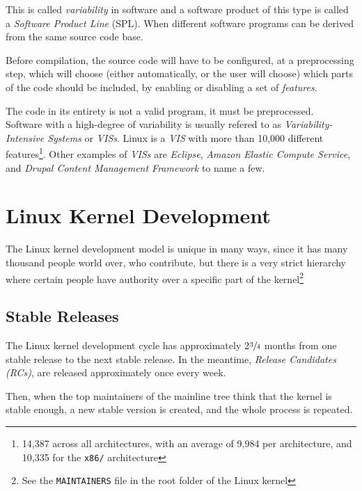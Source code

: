 \documentclass[a4paper,11pt]{report}
\newcommand{\textcode}[1]{
    \fboxsep=1pt
    \texttt{\colorbox{gray!20}{#1}}
}
\begin{document}
This is called \emph{variability} in software and a software product of 
this type is called a \emph{Software Product Line} (SPL). When different 
software programs can be derived from the same source code base. 

Before compilation, the source code will have to be configured, at a 
preprocessing step, which will choose (either automatically, or the user will 
choose) which parts of the code should be included, by enabling or disabling a 
set of \emph{features}. 

The code in its entirety is not a valid program, it must be preprocessed.
    \cite[p. 1]{IntDatSPL}
\\

Software with a high-degree of variability is usually refered to as 
\emph{Variability-Intensive Systems} or \emph{VISs}. Linux is a \emph{VIS} with 
more than 10,000 different features\footnote
    {14,387 across all architectures, with an average of 9,984 per 
    architecture, and 10,335 for the \texttt{x86/} architecture}.
Other examples of \emph{VISs} are 
\emph{Eclipse}, \emph{Amazon Elastic Compute Service}, and \emph{Drupal Content 
Management Framework}\cite
    [p. 1]{VarTesDrupal} to name a few.
\\


        \section{Linux Kernel Development}
The Linux kernel development model is unique in many ways, since it has many 
thousand people world over, who contribute, but there is a very strict 
hierarchy where certain people have authority over a specific part of the 
kernel\footnote
    {See the \textcode{MAINTAINERS} file in the root folder of the Linux kernel}


        \subsection*{Stable Releases}

The Linux kernel development cycle has approximately 2$\sfrac{3}{4}$ months 
from one stable release to the next stable release\cite
    {crystalball}.
In the meantime, \emph{Release Candidates (RCs)}, are released approximately 
once every week.

Then, when the top maintainers of the mainline tree think that the kernel is 
stable enough, a new stable version is created, and the whole process is 
repeated.
\end{document}
